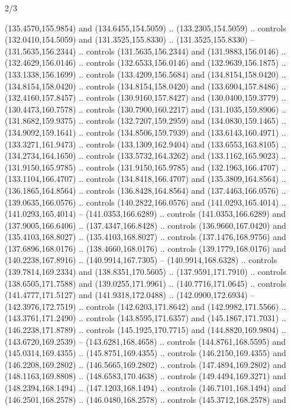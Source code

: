 \begin{flagdescription}{2/3}
\begin{scope}[xshift=0.5\flaglength,yshift=0.5\flagwidth,scale=\flagwidth/180]
\begin{scope}[y=0.8pt, x=0.8pt, yscale=-1,shift={(-168.75,-108.75)}]
  (135.4570,155.9854) and (134.6455,154.5059) .. (133.2305,154.5059) .. controls
  (132.0410,154.5059) and (131.3525,155.8330) .. (131.3525,155.8330) --
  (131.5635,156.2344) .. controls (131.5635,156.2344) and (131.9883,156.0146) ..
  (132.4629,156.0146) .. controls (132.6533,156.0146) and (132.9639,156.1875) ..
  (133.1338,156.1699) .. controls (133.4209,156.5684) and (134.8154,158.0420) ..
  (134.8154,158.0420) .. controls (134.8154,158.0420) and (133.6904,157.8486) ..
  (132.4160,157.8457) .. controls (130.9160,157.8427) and (130.0400,159.3779) ..
  (130.4473,160.7578) .. controls (130.7900,160.2217) and (131.1035,159.8906) ..
  (131.8682,159.9375) .. controls (132.7207,159.2959) and (134.0830,159.1465) ..
  (134.9092,159.1641) .. controls (134.8506,159.7939) and (133.6143,160.4971) ..
  (133.3271,161.9473) .. controls (133.1309,162.9404) and (133.6553,163.8105) ..
  (134.2734,164.1650) .. controls (133.5732,164.3262) and (133.1162,165.9023) ..
  (131.9150,165.9785) .. controls (131.9150,165.9785) and (132.1963,166.4707) ..
  (133.1104,166.4707) .. controls (134.8418,166.4707) and (135.3809,164.8564) ..
  (136.1865,164.8564) .. controls (136.8428,164.8564) and (137.4463,166.0576) ..
  (139.0635,166.0576) .. controls (140.2822,166.0576) and (141.0293,165.4014) ..
  (141.0293,165.4014) -- (141.0353,166.6289) .. controls (141.0353,166.6289) and
  (137.9005,166.6406) .. (137.4347,166.8428) .. controls (136.9660,167.0420) and
  (135.4103,168.8027) .. (135.4103,168.8027) .. controls (137.1476,168.9756) and
  (137.6896,168.0176) .. (138.4660,168.0176) .. controls (139.1779,168.0176) and
  (140.2238,167.8916) .. (140.9914,167.7305) -- (140.9914,168.6328) .. controls
  (139.7814,169.2334) and (138.8351,170.5605) .. (137.9591,171.7910) .. controls
  (138.6505,171.7588) and (139.0255,171.9961) .. (140.7716,171.0645) .. controls
  (141.4777,171.5127) and (141.9318,172.0488) .. (142.0900,172.6934) --
  (142.3976,172.7519) .. controls (142.6203,171.8642) and (142.9982,171.5566) ..
  (143.3761,171.2490) .. controls (143.8595,171.6357) and (145.1867,171.7031) ..
  (146.2238,171.8789) .. controls (145.1925,170.7715) and (144.8820,169.9804) ..
  (143.6720,169.2539) -- (143.6281,168.4658) .. controls (144.8761,168.5595) and
  (145.0314,169.4355) .. (145.8751,169.4355) .. controls (146.2150,169.4355) and
  (146.2208,169.2802) .. (146.5665,169.2802) .. controls (147.4894,169.2802) and
  (148.1163,169.8808) .. (148.6583,170.4638) .. controls (149.4494,169.3271) and
  (148.2394,168.1494) .. (147.1203,168.1494) .. controls (146.7101,168.1494) and
  (146.2501,168.2578) .. (146.0480,168.2578) .. controls (145.3712,168.2578) and

\end{scope}
\end{scope}
\end{flagdescription}

